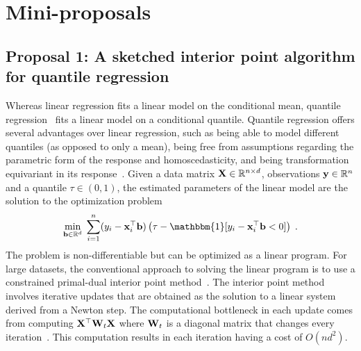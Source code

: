 

\section{Mini-proposals}

\subsection{Proposal 1: A sketched interior point algorithm for quantile regression} %

Whereas linear regression fits a linear model on the conditional mean, quantile regression~\citep{Koenker:1978} fits a linear model on a conditional quantile. Quantile regression offers several advantages over linear regression, such as being able to model different quantiles (as opposed to only a mean), being free from assumptions regarding the parametric form of the response and homoscedasticity, and being transformation equivariant in its response~\citep{Rodriguez:2017}. Given a data matrix $\mathbf{X}\in\mathbb{R}^{n\times d}$, observations $\mathbf{y}\in\mathbb{R}^{n}$ and a quantile $\tau\in(0,1)$, the estimated parameters of the linear model are the solution to the optimization problem
\[
\min_{\bfb\in\bbR^d} \; \sum_{i=1}^n(y_i-\bfx_i^\T\bfb)\left(\tau - \mathbbm{1}[y_i-\bfx_i^\top\bfb < 0]\right) \;.
\]
The problem is non-differentiable but can be optimized as a linear program. For large datasets, the conventional approach to solving the linear program is to use a constrained primal-dual interior point method~\citep{Portnoy:1997}. The interior point method involves iterative updates that are obtained as the solution to a linear system derived from a Newton step. The computational bottleneck in each update comes from  computing $\mathbf{X}^\top\mathbf{W}_t\mathbf{X}$ where $\mathbf{W}_t$ is a diagonal matrix that changes every iteration~\citep{Chen:2005}. This computation results in each iteration having a cost of $O(nd^2)$.
\\

